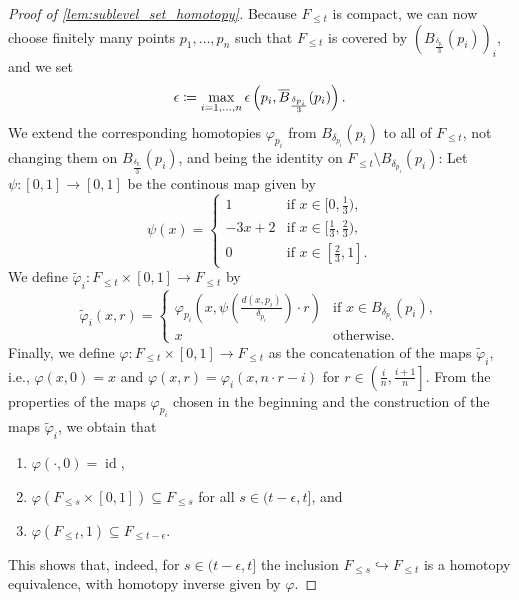 \begin{proof}[Proof of \cref{lem:sublevel_set_homotopy}]
	Because $F_{\leq t}$ is compact, we can now choose finitely many points $p_{1}, \dots, p_{n}$ such that $F_{\leq t}$ is covered by $( B_{\frac{\delta_{p_{i}}}{3}}(p_{i}))_{i}$, and we set
	\[
		\epsilon \coloneqq \max_{i = 1,\dots,n} \epsilon \left( p_{i}, \overline{B}_{\frac{\delta_{p_{i}}}{3}}(p_{i}) \right).
	\]
	We extend the corresponding homotopies $\varphi_{p_{i}}$ from $B_{\delta_{p_{i}}}(p_{i})$ to all of $F_{\leq t}$, not changing them on $B_{\frac{\delta_{p_{i}}}{3}}(p_{i})$, and being the identity on $F_{\leq t} \setminus B_{\delta_{p_{i}}}(p_{i})$:
	Let $\psi \colon [0,1] \to [0,1]$ be the continous map given by
	\[
		\psi(x) =
		\begin{cases}
			1 & \text{if } x \in [0,\frac{1}{3}), \\
			-3x + 2 & \text{if } x \in [\frac{1}{3}, \frac{2}{3}), \\
			0 & \text{if } x \in [\frac{2}{3},1].
		\end{cases}
	\]
	We define $\tilde{\varphi}_{i} \colon F_{\leq t} \times [0,1] \to F_{\leq t}$ by
	\[
		\tilde{\varphi}_{i}(x,r) =
		\begin{cases}
			\varphi_{p_{i}} \left( x, \psi \left( \frac{d(x,p_{i})}{\delta_{p_{i}}} \right) \cdot r \right)  & \text{if } x \in B_{\delta_{p_{i}}}(p_{i}), \\
			x & \text{otherwise}.
		\end{cases}
	\]
	Finally, we define $\varphi \colon F_{\leq t} \times [0,1] \to F_{\leq t}$ as the concatenation of the maps $\tilde{\varphi}_{i}$, i.e., $\varphi(x,0) = x$ and $\varphi(x,r) = \varphi_{i} \left( x, n \cdot r - i \right)$ for $r \in \left( \frac{i}{n}, \frac{i+1}{n} \right]$.
	From the properties of the maps $\varphi_{p_{i}}$ chosen in the beginning and the construction of the maps $\tilde{\varphi}_{i}$, we obtain that
	\begin{enumerate}
		\item $\varphi(\cdot, 0) = \operatorname{id}$,
		\item $\varphi(F_{\leq s} \times [0,1]) \subseteq F_{\leq s}$ for all $s \in (t - \epsilon, t]$, and
		\item $\varphi(F_{\leq t}, 1) \subseteq F_{\leq t - \epsilon}$.
	\end{enumerate}
	This shows that, indeed, for $s \in (t - \epsilon, t]$ the inclusion $F_{\leq s} \hookrightarrow F_{\leq t}$ is a homotopy equivalence, with homotopy inverse given by $\varphi$.
\end{proof}

